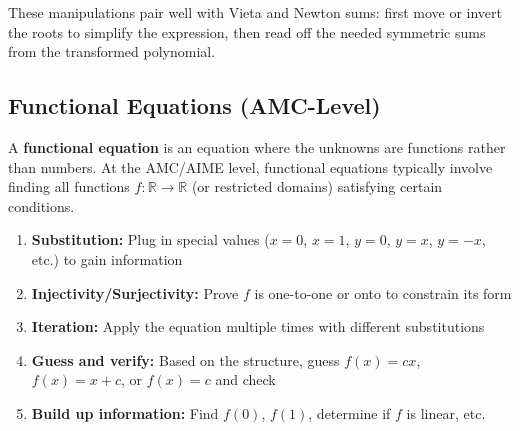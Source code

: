 \documentclass[12pt]{extarticle}
\begin{document}
\begin{remarkbox}
These manipulations pair well with Vieta and Newton sums: first move or invert the roots to simplify the expression, then read off the needed symmetric sums from the transformed polynomial.
\end{remarkbox}

\subsection{Functional Equations (AMC-Level)}

A \textbf{functional equation} is an equation where the unknowns are functions rather than numbers. At the AMC/AIME level, functional equations typically involve finding all functions $f: \mathbb{R} \to \mathbb{R}$ (or restricted domains) satisfying certain conditions.

\begin{conceptbox}
\begin{enumerate}
    \item \textbf{Substitution:} Plug in special values ($x=0$, $x=1$, $y=0$, $y=x$, $y=-x$, etc.) to gain information
    \item \textbf{Injectivity/Surjectivity:} Prove $f$ is one-to-one or onto to constrain its form
    \item \textbf{Iteration:} Apply the equation multiple times with different substitutions
    \item \textbf{Guess and verify:} Based on the structure, guess $f(x) = cx$, $f(x) = x + c$, or $f(x) = c$ and check
    \item \textbf{Build up information:} Find $f(0)$, $f(1)$, determine if $f$ is linear, etc.
\end{enumerate}
\end{conceptbox}
\end{document}
